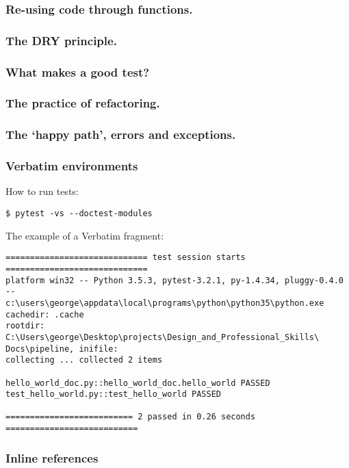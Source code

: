 \documentclass{beamer}
\begin{document}
\begin{frame}
\frametitle{Re-using code through functions.}
\end{frame}


\begin{frame}
\frametitle{The DRY principle.}
\end{frame}



\begin{frame}
\frametitle{What makes a good test?}
\end{frame}

\begin{frame}
\frametitle{The practice of refactoring.}
\end{frame}

\begin{frame}
\frametitle{The `happy path', errors and exceptions.}
\end{frame}



\begin{frame}[fragile]
\frametitle{Verbatim environments} 

How to run tests:
\begin{verbatim}
$ pytest -vs --doctest-modules
\end{verbatim}

\vspace{5mm}  

The example of a Verbatim fragment:
\scriptsize %
\begin{verbatim}
============================= test session starts =============================
platform win32 -- Python 3.5.3, pytest-3.2.1, py-1.4.34, pluggy-0.4.0 -- 
c:\users\george\appdata\local\programs\python\python35\python.exe
cachedir: .cache
rootdir: C:\Users\george\Desktop\projects\Design_and_Professional_Skills\
Docs\pipeline, inifile:
collecting ... collected 2 items

hello_world_doc.py::hello_world_doc.hello_world PASSED
test_hello_world.py::test_hello_world PASSED

========================== 2 passed in 0.26 seconds ===========================
\end{verbatim}

\end{frame}

\begin{frame}
\frametitle{Inline references}


\end{frame}


\end{document}
